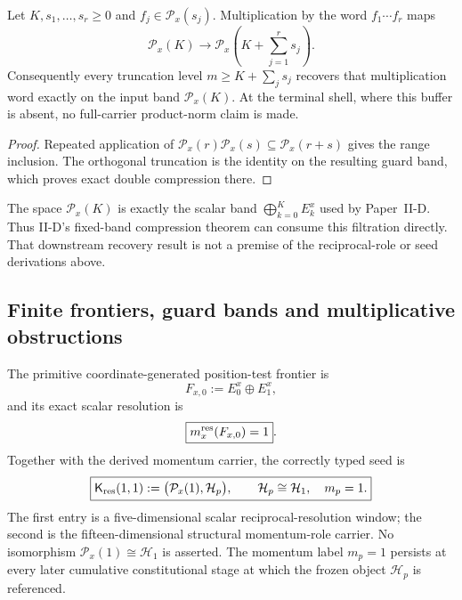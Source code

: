 \documentclass[12pt,a4paper]{article}
\begin{document}
\begin{corollary}
\label{p2c:cor:nonlinear-position-guard-band}
Let \(K,s_1,\ldots,s_r\ge0\) and
\(f_j\in\mathcal P_x(s_j)\).  Multiplication by the word
\(f_1\cdots f_r\) maps
\[
 \mathcal P_x(K)\longrightarrow
 \mathcal P_x\!\left(K+\sum_{j=1}^rs_j\right).
\]
Consequently every truncation level
\(m\ge K+\sum_js_j\) recovers that multiplication word exactly on the
input band \(\mathcal P_x(K)\).  At the terminal shell, where this buffer is
absent, no full-carrier product-norm claim is made.
\end{corollary}

\begin{proof}
Repeated application of
\(\mathcal P_x(r)\mathcal P_x(s)\subseteq\mathcal P_x(r+s)\) gives the
range inclusion.  The orthogonal truncation is the identity on the resulting
guard band, which proves exact double compression there.
\end{proof}

\begin{remark}
\label{p2c:rem:scalar-band-recovery-export}
The space \(\mathcal P_x(K)\) is exactly the scalar band
\(\bigoplus_{k=0}^{K}E_k^x\) used by Paper~II-D.  Thus II-D's fixed-band
compression theorem can consume this filtration directly.  That downstream
recovery result is not a premise of the reciprocal-role or seed derivations
above.
\end{remark}

\subsection{Finite frontiers, guard bands and multiplicative obstructions}

\begin{corollary}
\label{p2c:cor:derived-reciprocal-resolution-seed}
\label{p2c:cor:conditional-reciprocal-seed-branch}
The primitive coordinate-generated position-test frontier is
\[
        F_{x,0}:=E_0^x\oplus E_1^x,
\]
and its exact scalar resolution is
\[
        \boxed{m_x^{\rm res}(F_{x,0})=1}.
\]
Together with the derived momentum carrier, the correctly typed seed is
\[
 \boxed{
 \mathsf K_{\rm res}(1,1)
 :=\bigl(\mathcal P_x(1),\mathcal H_p\bigr),
 \qquad
 \mathcal H_p\cong\mathcal H_1,\quad m_p=1.}
\]
The first entry is a five-dimensional scalar reciprocal-resolution window;
the second is the fifteen-dimensional structural momentum-role carrier.  No
isomorphism \(\mathcal P_x(1)\cong\mathcal H_1\) is asserted.  The momentum
label \(m_p=1\) persists at every later cumulative constitutional stage at
which the frozen object \(\mathcal H_p\) is referenced.
\end{corollary}
\end{document}
